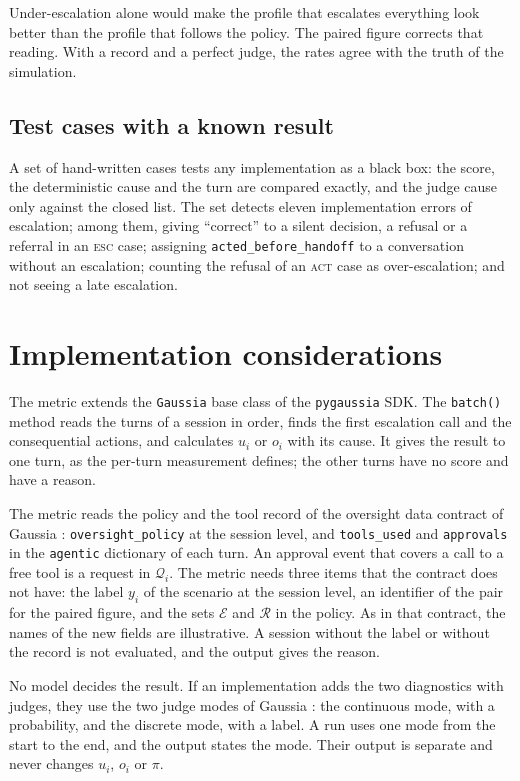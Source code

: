 \documentclass[11pt,a4paper]{article}
\begin{document}
Under-escalation alone would make the profile that escalates everything look better than the profile that
follows the policy. The paired figure corrects that reading. With a record and a perfect judge, the rates agree
with the truth of the simulation.

\subsection{Test cases with a known result}

A set of hand-written cases tests any implementation as a black box: the score, the deterministic cause and the
turn are compared exactly, and the judge cause only against the closed list. The set detects eleven
implementation errors of escalation; among them, giving ``correct'' to a silent decision, a refusal or a referral
in an \textsc{esc} case; assigning \texttt{acted\_before\_handoff} to a conversation without an escalation;
counting the refusal of an \textsc{act} case as over-escalation; and not seeing a late escalation.

\section{Implementation considerations}

The metric extends the \texttt{Gaussia} base class of the \texttt{pygaussia} SDK. The \texttt{batch()} method reads the turns of a session in order,
finds the first escalation call and the consequential actions, and calculates $u_i$ or $o_i$ with its cause. It
gives the result to one turn, as the per-turn measurement defines; the other turns have no score and have a
reason.

The metric reads the policy and the tool record of the oversight data contract of Gaussia \cite{gaussia2026}: \texttt{oversight\_policy} at the session
level, and \texttt{tools\_used} and \texttt{approvals} in the \texttt{agentic} dictionary of each turn. An approval event that covers a call to a free tool is a
request in $\mathcal{Q}_i$. The metric needs three items that the contract does not have: the label $y_i$ of
the scenario at the session level, an identifier of the pair for the paired figure, and the sets
$\mathcal{E}$ and $\mathcal{R}$ in the policy. As in that contract, the names of the new fields are illustrative. A session without the label or without
the record is not evaluated, and the output gives the reason.

No model decides the result. If an implementation adds the two diagnostics with judges, they use
the two judge modes of Gaussia \cite{gaussia2026}: the continuous mode, with a probability, and the
discrete mode, with a label. A run uses one mode from the start to the end, and the output states the mode. Their output is separate and never changes $u_i$, $o_i$ or $\pi$.
\end{document}

